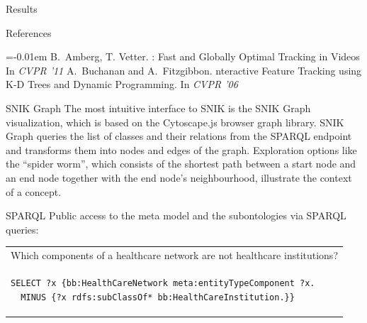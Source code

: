 \documentclass[portrait,final,a0paper,fontscale=0.277]{baposter}
\begin{document}
\begin{poster}
\begin{posterbox}[name=results,below=background]{Results}
\end{posterbox}
\begin{posterbox}[name=references,column=0,below=results]{References}
    \smaller
    
    \renewcommand{\section}[2]{\vskip 0.05em}
      \begin{thebibliography}{1}\itemsep=-0.01em
      \setlength{\baselineskip}{0.4em}
        B.~Amberg, T. Vetter.
        : {F}ast and {G}lobally {O}ptimal {T}racking in {V}ideos
        \newblock In {\em CVPR '11}
        A.~Buchanan and A.~Fitzgibbon.
        nteractive {F}eature {T}racking using {K-D} {T}rees and {D}ynamic {P}rogramming.
        \newblock In {\em CVPR '06}
      \end{thebibliography}
   \vspace{0.3em}
  \end{posterbox}
\begin{posterbox}[name=snikgraph,column=1,row=0]{SNIK Graph}
\indent
The most intuitive interface to SNIK is the SNIK Graph visualization, which is based on the Cytoscape.js browser graph library.
SNIK Graph queries the list of classes and their relations from the SPARQL endpoint and transforms them into nodes and edges of the graph.
Exploration options like the “spider worm”, which consists of the shortest path between a start node and an end node together with the end node’s neighbourhood, illustrate the context of a concept.
\vspace{0.3em}
  \end{posterbox}
\begin{posterbox}[name=sparql,column=1,span=2,above=bottom]{SPARQL}
\noindent
Public access to the meta model and the subontologies via SPARQL queries:

\vspace{1em}
{
\centering
\begin{tabular*}{\columnwidth}{l}
Which components of a healthcare network are not healthcare institutions?\\
\begin{lstlisting}
SELECT ?x {bb:HealthCareNetwork meta:entityTypeComponent ?x.
  MINUS {?x rdfs:subClassOf* bb:HealthCareInstitution.}}
\end{lstlisting}\\


\end{tabular*}}
\end{posterbox}
\end{poster}
\end{document}
